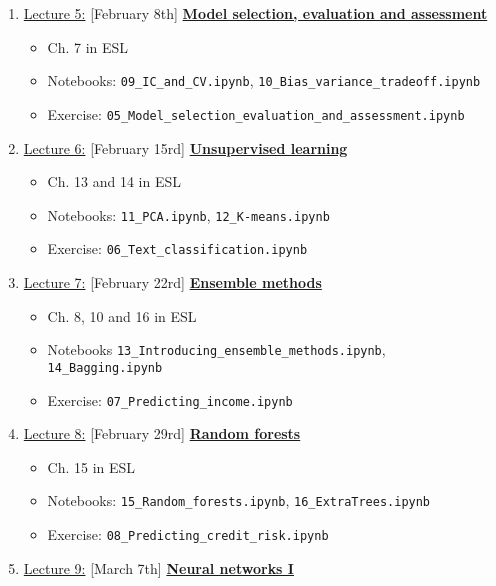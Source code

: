 \documentclass[12pt, a4paper]{article}
\begin{document}
\begin{enumerate}
{\begin{itemize}
          \end{itemize}
        }
  \item[] \underline{Lecture 5:} [February 8th] \underline{\bf Model selection, evaluation and assessment}
    {\small
      \begin{itemize}
        \item Ch. 7 in ESL
        \item Notebooks: \texttt{09\_IC\_and\_CV.ipynb}, \texttt{10\_Bias\_variance\_tradeoff.ipynb}
        \item Exercise: \texttt{05\_Model\_selection\_evaluation\_and\_assessment.ipynb}
      \end{itemize}
    }
  \item[] \underline{Lecture 6:} [February 15rd] \underline{\bf Unsupervised learning}
    {\small
      \begin{itemize}
        \item Ch. 13 and 14 in ESL
        \item Notebooks: \texttt{11\_PCA.ipynb}, \texttt{12\_K-means.ipynb}
        \item Exercise: \texttt{06\_Text\_classification.ipynb}
      \end{itemize}
    }
  \item[] \underline{Lecture 7:} [February 22rd] \underline{\bf Ensemble methods}
    {\small
      \begin{itemize}
        \item Ch. 8, 10 and  16 in ESL
        \item Notebooks \texttt{13\_Introducing\_ensemble\_methods.ipynb}, \texttt{14\_Bagging.ipynb}
        \item Exercise: \texttt{07\_Predicting\_income.ipynb}
      \end{itemize}
    }
  \item[] \underline{Lecture 8:} [February 29rd] \underline{\bf Random forests}
    {\small
      \begin{itemize}
        \item Ch. 15 in ESL
        \item Notebooks: \texttt{15\_Random\_forests.ipynb}, \texttt{16\_ExtraTrees.ipynb}
        \item Exercise: \texttt{08\_Predicting\_credit\_risk.ipynb}
      \end{itemize}
    }
  \item[] \underline{Lecture 9:} [March 7th] \underline{\bf Neural networks I}
    {\small
      \begin{itemize}

\end{itemize}}
\end{enumerate}
\end{document}
